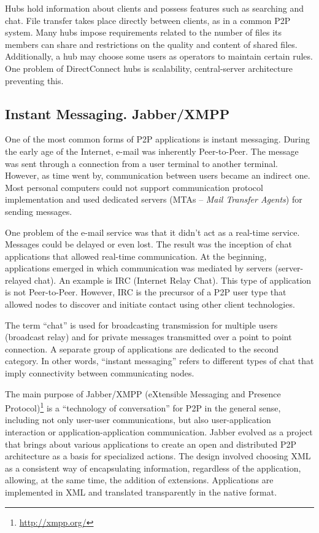 Hubs hold information about clients and possess features such as searching and
chat. File transfer takes place directly between clients, as in a common P2P
system. Many hubs impose requirements related to the number of files its
members can share and restrictions on the quality and content of shared
files. Additionally, a hub may choose some users as operators to maintain
certain rules. One problem of DirectConnect hubs is scalability,
central-server architecture preventing this.

\subsection{Instant Messaging. Jabber/XMPP}

One of the most common forms of P2P applications is instant messaging. During
the early age of the Internet, e-mail was inherently Peer-to-Peer. The message
was sent through a connection from a user terminal to another terminal.
However, as time went by, communication between users became an indirect one. Most
personal computers could not support communication protocol implementation and used dedicated
servers (MTAs -- \textit{Mail Transfer Agents}) for sending messages.

One problem of the e-mail service was that it didn't act as a real-time service.
Messages could be delayed or even lost. The result was the inception of
chat applications that allowed real-time communication. At the beginning,
applications emerged in which communication was mediated by servers
(server-relayed chat). An example is IRC (Internet Relay Chat). This type of
application is not Peer-to-Peer. However, IRC is the precursor of a P2P user type
that allowed nodes to discover and initiate contact using other client
technologies.

The term ``chat'' is used for broadcasting transmission for
multiple users (broadcast relay) and for private messages transmitted over a
point to point connection. A separate group of applications are dedicated to
the second category. In other words, ``instant messaging'' refers to different
types of chat that imply connectivity between communicating nodes.

The main purpose of Jabber/XMPP (eXtensible Messaging and Presence
Protocol)\footnote{\url{http://xmpp.org/}}
is a ``technology of conversation'' for P2P in the general sense, including
not only user-user communications, but also user-application interaction or
application-application communication. Jabber evolved as a project that brings about various
applications to create an open and distributed P2P architecture as a basis for
specialized actions. The design involved choosing XML as a consistent way of
encapsulating information, regardless of the application, allowing, at the
same time, the
addition of extensions. Applications are implemented in XML and translated
transparently in the native format.

